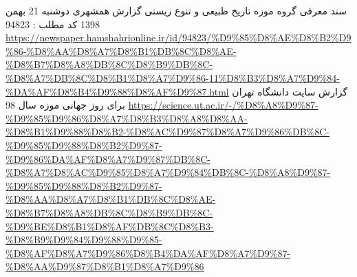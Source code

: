 
\begin{thebibliography}{9} \label{chapter:references}


	 سند معرفی گروه موزه تاریخ طبیعی و تنوع زیستی
	 گزارش همشهری دوشنبه 21 بهمن 1398 کد مطلب :  94823 \url{https://newspaper.hamshahrionline.ir/id/94823/%D9%85%D8%AE%D8%B2%D9%86-%D8%AA%D8%A7%D8%B1%DB%8C%D8%AE-%D8%B7%D8%A8%DB%8C%D8%B9%DB%8C-%D8%A7%DB%8C%D8%B1%D8%A7%D9%86-11%D8%B3%D8%A7%D9%84-%DA%AF%D8%B4%D9%88%D8%AF%D9%87.html}
	  گزارش سایت دانشگاه تهران برای روز جهانی موزه سال 98 \url{https://science.ut.ac.ir/-/%D8%A8%D9%87-%D9%85%D9%86%D8%A7%D8%B3%D8%A8%D8%AA-%D8%B1%D9%88%D8%B2-%D8%AC%D9%87%D8%A7%D9%86%DB%8C-%D9%85%D9%88%D8%B2%D9%87-%D9%86%DA%AF%D8%A7%D9%87%DB%8C-%D8%A7%D8%AC%D9%85%D8%A7%D9%84%DB%8C-%D8%A8%D9%87-%D9%85%D9%88%D8%B2%D9%87-%D8%AA%D8%A7%D8%B1%DB%8C%D8%AE-%D8%B7%D8%A8%DB%8C%D8%B9%DB%8C-%D9%BE%D8%B1%D8%AF%DB%8C%D8%B3-%D8%B9%D9%84%D9%88%D9%85-%D8%AF%D8%A7%D9%86%D8%B4%DA%AF%D8%A7%D9%87-%D8%AA%D9%87%D8%B1%D8%A7%D9%86}



\end{thebibliography}
